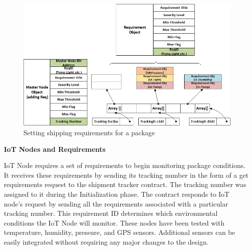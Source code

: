 \begin{figure}[h]
	\centering
    \includegraphics[width=170mm,scale=1]{figs/requirement-impl}
	\caption{Setting shipping requirements for a package}
	\label{fig:requirement-impl} 
\end{figure}

\textbf{IoT Nodes and Requirements} 

IoT Node requires a set of requirements to begin monitoring package conditions. It receives these requirements by sending its tracking number in the form of a get requirements request to the shipment tracker contract. The tracking number was assigned to it during the Initialization phase. The contract responds to IoT node’s request by sending all the requirements associated with a particular tracking number. This requirement ID determines which environmental conditions the IoT Node will monitor. These nodes have been tested with temperature, humidity, pressure, and GPS sensors. Additional sensors can be easily integrated without requiring any major changes to the design. %

